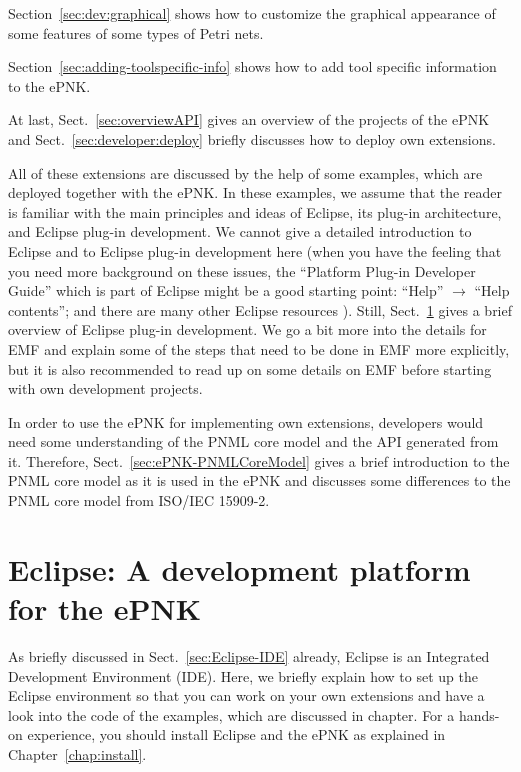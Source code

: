 Section~\ref{sec:dev:graphical} shows how to customize the graphical
appearance of some features of some types of Petri nets.

Section~\ref{sec:adding-toolspecific-info} shows how to add tool specific
information to the ePNK.

At last, Sect.~\ref{sec:overviewAPI} gives an overview of the projects of the
ePNK and Sect.~\ref{sec:developer:deploy} briefly discusses how to deploy own
extensions.

All of these extensions are discussed by the help of some examples,
which are deployed together with the ePNK. In these examples,
we assume that the reader is familiar with the main principles and ideas
of Eclipse, its plug-in architecture, and Eclipse plug-in development.
We cannot give a detailed introduction to Eclipse and to Eclipse
plug-in development here (when you have the feeling that you need more
background on these issues, the ``Platform Plug-in Developer Guide'' which is part of Eclipse
might be a good starting point: ``Help'' $\rightarrow$ ``Help contents''; and there
are many other Eclipse resources \cite{Eclipse-WWW,ClRu08}).
Still, Sect.~\ref{sec:development-environment} gives a brief overview
of Eclipse plug-in development.
We go a bit more into the details for EMF and explain some of the steps that
need to be done in EMF more explicitly, but it is also recommended to read
up on some details on EMF \cite{BSM06} before starting with own development
projects. 

In order to use the ePNK for implementing own extensions, developers would
need some understanding of the PNML core model and the API generated from
it. Therefore, Sect.~\ref{sec:ePNK-PNMLCoreModel} gives a brief introduction
to the PNML core model as it is used in the ePNK and discusses some differences
to the PNML core model from ISO/IEC 15909-2. 

\section{Eclipse: A development platform for the ePNK}
\label{sec:development-environment}

As briefly discussed in Sect.~\ref{sec:Eclipse-IDE} already, Eclipse is
an Integrated Development Environment (IDE).%
Here, we briefly explain how to set up the Eclipse environment so that you can
work on your own extensions and have a look into the code of the
examples, which are discussed in chapter. For a hands-on experience, you
should install Eclipse and the ePNK as explained in Chapter~\ref{chap:install}.

